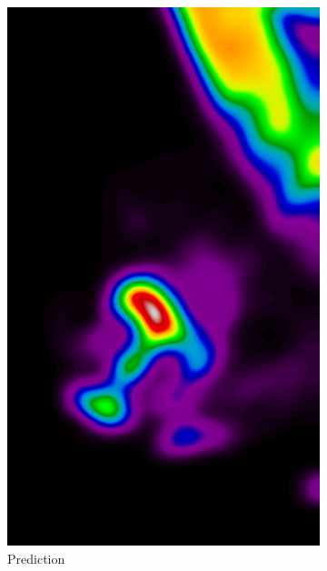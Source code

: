 \begin{figure}[h]
	\centering
	\begin{subfigure}{0.2\textwidth}
		\centering
                \includegraphics[width=\textwidth]{plots/probs.png}
         \caption{Prediction}
	\end{subfigure}
	\quad
	\begin{subfigure}{0.2\textwidth}
		\centering

\end{subfigure}
\end{figure}
